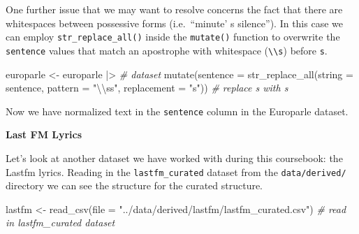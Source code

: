 \documentclass[
  letterpaper,
]{scrbook}
\newenvironment{Shaded}{\begin{snugshade}}{\end{snugshade}}
\newcommand{\AttributeTok}[1]{\textcolor[rgb]{0.00,0.00,0.00}{#1}}
\newcommand{\CommentTok}[1]{\textcolor[rgb]{0.00,0.00,0.00}{\textit{#1}}}
\newcommand{\FunctionTok}[1]{\textcolor[rgb]{0.00,0.00,0.00}{#1}}
\newcommand{\NormalTok}[1]{\textcolor[rgb]{0.00,0.00,0.00}{#1}}
\newcommand{\OtherTok}[1]{\textcolor[rgb]{0.00,0.00,0.00}{#1}}
\newcommand{\SpecialCharTok}[1]{\textcolor[rgb]{0.00,0.00,0.00}{#1}}
\newcommand{\StringTok}[1]{\textcolor[rgb]{0.00,0.00,0.00}{#1}}
\begin{document}
One further issue that we may want to resolve concerns the fact that
there are whitespaces between possessive forms (i.e.~``minute' s
silence''). In this case we can employ \texttt{str\_replace\_all()}
inside the \texttt{mutate()} function to overwrite the \texttt{sentence}
values that match an apostrophe \texttt{\textquotesingle{}} with
whitespace (\texttt{\textbackslash{}\textbackslash{}s}) before
\texttt{s}.

\begin{Shaded}
\begin{Highlighting}[]
\NormalTok{europarle }\OtherTok{\textless{}{-}} 
\NormalTok{  europarle }\SpecialCharTok{|\textgreater{}} \CommentTok{\# dataset}
  \FunctionTok{mutate}\NormalTok{(}\AttributeTok{sentence =} \FunctionTok{str\_replace\_all}\NormalTok{(}\AttributeTok{string =}\NormalTok{ sentence, }
                                    \AttributeTok{pattern =} \StringTok{"\textquotesingle{}}\SpecialCharTok{\textbackslash{}\textbackslash{}}\StringTok{ss"}\NormalTok{, }
                                    \AttributeTok{replacement =} \StringTok{"\textquotesingle{}s"}\NormalTok{)) }\CommentTok{\# replace \textquotesingle{} s with \textasciigrave{}s}
\end{Highlighting}
\end{Shaded}

Now we have normalized text in the \texttt{sentence} column in the
Europarle dataset.

\textbf{Last FM Lyrics}

Let's look at another dataset we have worked with during this
coursebook: the Lastfm lyrics. Reading in the \texttt{lastfm\_curated}
dataset from the \texttt{data/derived/} directory we can see the
structure for the curated structure.

\begin{Shaded}
\begin{Highlighting}[]
\NormalTok{lastfm }\OtherTok{\textless{}{-}} \FunctionTok{read\_csv}\NormalTok{(}\AttributeTok{file =} \StringTok{"../data/derived/lastfm/lastfm\_curated.csv"}\NormalTok{) }\CommentTok{\# read in lastfm\_curated dataset}
\end{Highlighting}
\end{Shaded}
\end{document}
